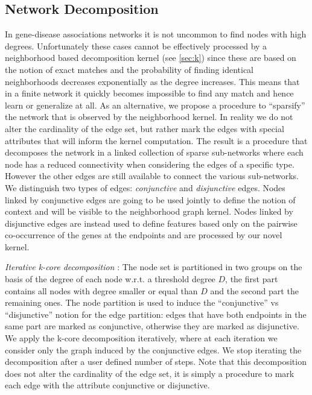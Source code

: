 \subsection{Network Decomposition} 
In gene-disease associations networks it is not uncommon to find nodes with high degrees. Unfortunately these cases cannot be effectively processed by a neighborhood based decomposition kernel (see \ref{sec:k}) since these are based on the notion of exact matches and the probability of finding identical neighborhoods decreases exponentially as the degree increases. This means that in a finite network it quickly becomes impossible to find any match and hence learn or generalize at all. As an alternative, we propose a procedure to ``sparsify'' the network that is observed by the neighborhood kernel. In reality we do not alter the cardinality of the edge set, but rather mark the edges with special attributes that will inform the kernel computation. The result is a procedure that decomposes the network in a linked collection of sparse sub-networks where each node has a reduced connectivity when considering the edges of a specific type. However the other edges are still available to connect the various sub-networks. We distinguish two types of edges: {\em conjunctive} and {\em disjunctive} edges. Nodes linked by conjunctive edges are going to be used jointly to define the notion of context and will be visible to the neighborhood graph kernel. Nodes linked by disjunctive edges are instead used to define features based only on the pairwise co-occurrence of the genes at the endpoints and are processed by our novel kernel.




\textit{Iterative k-core decomposition} \cite{alvarez2005k}: The node set is partitioned in two groups on the basis of the degree of each node w.r.t. a threshold degree $D$, the first part contains all nodes with degree smaller or equal than $D$ and the second part the remaining ones. The node partition is used to induce the ``conjunctive'' vs ``disjunctive'' notion for the edge partition: edges that have both endpoints in the same part are marked as conjunctive, otherwise they are marked as disjunctive. We apply the k-core decomposition iteratively, where at each iteration we consider only the graph induced by the conjunctive edges. We stop iterating the decomposition after a user defined number of steps. Note that this decomposition does not alter the cardinality of the edge set, it is simply a procedure to mark each edge with the attribute conjunctive or disjunctive.  

